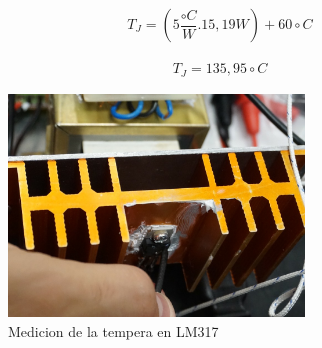\begin{equation}
  \begin{aligned}
    T_J = (5\dfrac{\circ C}{W} . 15,19 W) + 60 \circ C
  \end{aligned}
\end{equation}

\begin{equation}
  \begin{aligned}
    T_J = 135,95 \circ C
  \end{aligned}
\end{equation}

   
\begin{figure}[H]
  \centering
  \includegraphics[width=0.70\textwidth]{images/medicionTemperatura.png}
  \caption{Medicion de la tempera en LM317}
\end{figure}

